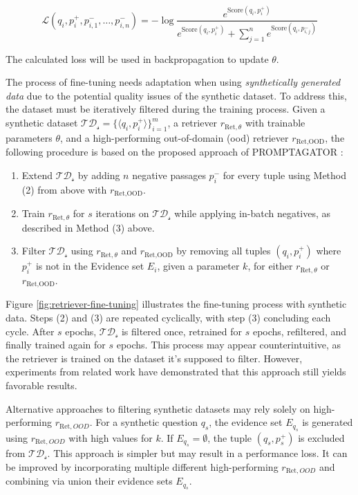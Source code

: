 \begin{equation}
    \mathcal{L}(q_i, p_i^+,p_{i,1}^-, \dots, p_{i,n}^-) = -\log \frac{e^{\text{Score}(q_i,p_i^+)}}{e^{\text{Score}(q_i,p_i^+)} + \sum_{j=1}^{n} e^{\text{Score}(q_i,p_{i,j}^-)}}
\end{equation}

The calculated loss will be used in backpropagation to update $\theta$.

The process of fine-tuning needs adaptation when using \textit{synthetically generated data} due to the potential quality issues of the synthetic dataset. To address this, the dataset must be iteratively filtered during the training process. Given a synthetic dataset $\mathcal{TD_s} = \{\langle q_i, p_i^+\rangle\}_{i=1}^m$, a retriever $r_{\text{Ret}, \theta}$ with trainable parameters $\theta$, and a high-performing out-of-domain (\gls{ood}) retriever $r_{\text{Ret},\text{OOD}}$, the following procedure is based on the proposed approach of PROMPTAGATOR \cite{dai_promptagator_2022}:

\begin{enumerate}
    \item Extend $\mathcal{TD_s}$ by adding $n$ negative passages $p_i^-$ for every tuple using Method (2) from above with $r_{\text{Ret},\text{OOD}}$.
    \item Train $r_{\text{Ret}, \theta}$ for $s$ iterations on $\mathcal{TD_s}$ while applying in-batch negatives, as described in Method (3) above.
    \item Filter $\mathcal{TD_s}$ using $r_{\text{Ret}, \theta}$ and $r_{\text{Ret}, \text{OOD}}$ by removing all tuples $(q_i, p_i^+)$ where $p_i^+$ is not in the Evidence set $E_i$, given a parameter $k$, for either $r_{\text{Ret}, \theta}$ or $r_{\text{Ret}, \text{OOD}}$.
\end{enumerate}

Figure \ref{fig:retriever-fine-tuning} illustrates the fine-tuning process with synthetic data. Steps (2) and (3) are repeated cyclically, with step (3) concluding each cycle. After $s$ epochs, $\mathcal{TD_s}$ is filtered once, retrained for $s$ epochs, refiltered, and finally trained again for $s$ epochs. This process may appear counterintuitive, as the retriever is trained on the dataset it's supposed to filter. However, experiments from related work \cite{dai_promptagator_2022} have demonstrated that this approach still yields favorable results. 

Alternative approaches to filtering synthetic datasets may rely solely on high-performing $r_{\text{Ret}, OOD}$. For a synthetic question $q_s$, the evidence set $E_{q_s}$ is generated using $r_{\text{Ret}, OOD}$ with high values for $k$. If $E_{q_s} = \emptyset$, the tuple $(q_s, p_s^+)$ is excluded from $\mathcal{TD_s}$. This approach is simpler but may result in a performance loss. It can be improved by incorporating multiple different high-performing $r_{\text{Ret}, OOD}$ and combining via union their evidence sets $E_{q_s}$.


